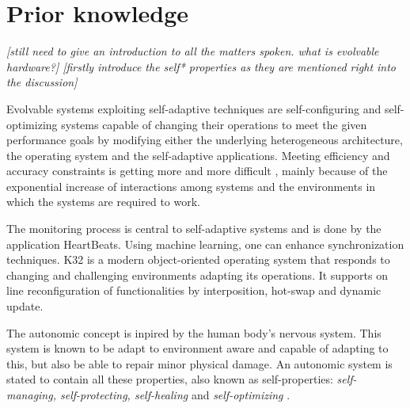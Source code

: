 
\section{Prior knowledge}

\emph{
[still need to give an introduction to all the matters spoken. what is evolvable hardware?]
[firstly introduce the self* properties as they are mentioned right into the discussion]
}

Evolvable systems exploiting self-adaptive techniques are self-configuring and self-optimizing systems capable of changing their operations to meet the given performance goals by modifying either the underlying heterogeneous architecture, the operating system and the self-adaptive applications. \cite{evolvable}
Meeting efficiency and accuracy constraints is getting more and more difficult , mainly because of the exponential increase of interactions among systems and the environments in which the systems are required to work. 

The monitoring process is central to self-adaptive systems and is done by the application HeartBeats. 
Using machine learning, one can enhance synchronization techniques. K32 is a modern object-oriented operating system that responds to changing and challenging environments adapting its operations. It supports on line reconfiguration of functionalities by interposition, hot-swap and dynamic update. \cite{evolvable}


The autonomic concept is inpired by the human body's nervous system. This system is known to be adapt to environment aware and capable of adapting to this, but also be able to repair minor physical damage. An autonomic system is stated to contain all these properties, also known as self-properties: \emph{self-managing, self-protecting, self-healing} and \emph{self-optimizing} \cite{autonomic}. 
